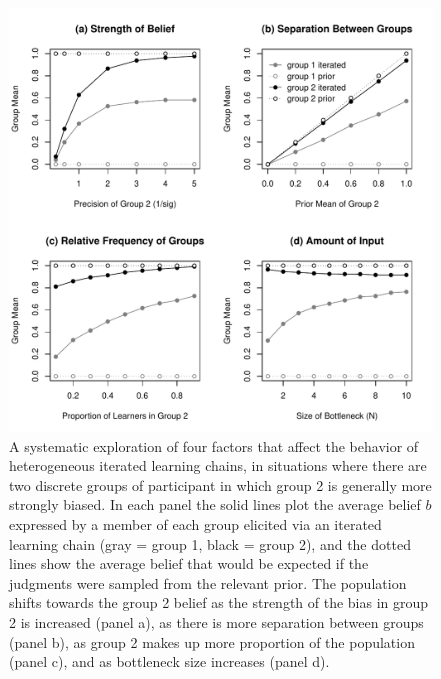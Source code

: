 \documentclass[doc]{apa6}
\begin{document}
\begin{figure}[!h]
\begin{center}
\includegraphics[width=14cm]{two-group-sim.pdf}
\caption{\small{A systematic exploration of four factors that affect the behavior of heterogeneous iterated learning chains, in situations where there are two discrete groups of participant in which group 2 is generally more strongly biased. In each panel the solid lines plot the average belief $b$ expressed by a member of each group elicited via an iterated learning chain (gray = group 1, black = group 2), and the dotted lines show the average belief that would be expected if the judgments were sampled from the relevant prior. The population shifts towards the group 2 belief as the strength of the bias in group 2 is increased (panel a), as there is more separation between groups (panel b), as group 2 makes up more proportion of the population (panel c), and as bottleneck size increases (panel d).}}
\label{fig:two-group-sim}
\end{center}
\end{figure}
\end{document}
